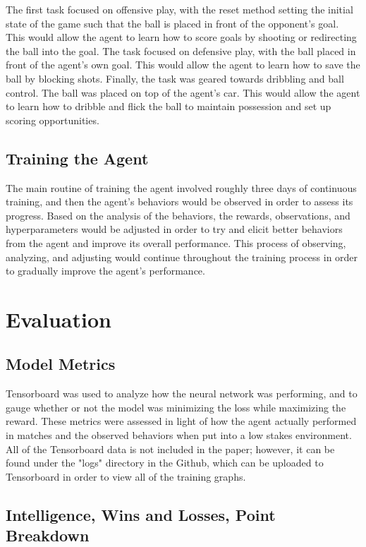\documentclass[10pt,twocolumn]{article}
\begin{document}
 The first task focused on offensive play, with the reset method setting the initial state of the game such that the ball is placed in front of the opponent's goal. This would allow the agent to learn how to score goals by shooting or redirecting the ball into the goal. The task focused on defensive play, with the ball placed in front of the agent's own goal. This would allow the agent to learn how to save the ball by blocking shots. Finally, the task was geared towards dribbling and ball control. The ball was placed on top of the agent's car. This would allow the agent to learn how to dribble and flick the ball to maintain possession and set up scoring opportunities.

\subsection{Training the Agent}
 The main routine of training the agent involved roughly three days of continuous training, and then the agent's behaviors would be observed in order to assess its progress. Based on the analysis of the behaviors, the rewards, observations, and hyperparameters would be adjusted in order to try and elicit better behaviors from the agent and improve its overall performance. This process of observing, analyzing, and adjusting would continue throughout the training process in order to gradually improve the agent's performance.
 
\section{Evaluation}

\subsection{Model Metrics}
 Tensorboard was used to analyze how the neural network was 
 performing, and to gauge whether or not the model was 
 minimizing the loss while maximizing the reward. These 
 metrics were assessed in light of how the agent actually 
 performed in matches and the observed behaviors when put 
 into a low stakes environment. All of the Tensorboard data 
 is not included in the paper; however, it can be found under 
 the "logs" directory in the Github, which can be uploaded to 
 Tensorboard in order to view all of the training graphs.

\subsection{Intelligence, Wins and Losses, Point Breakdown}
\end{document}
